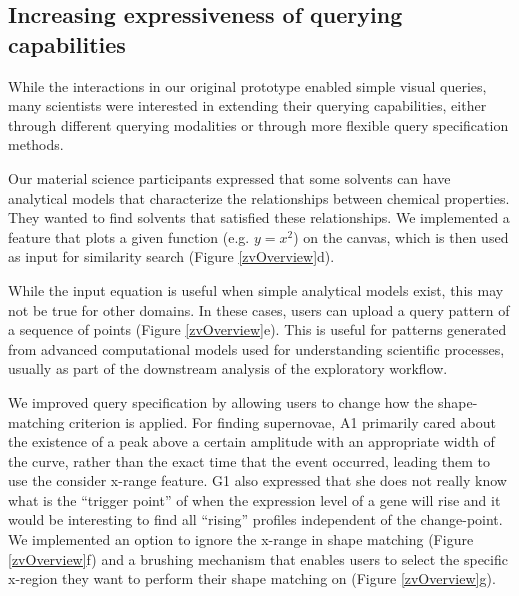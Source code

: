 \subsection{Increasing expressiveness of querying capabilities}
\par While the interactions in our original prototype enabled simple visual queries, many scientists were interested in extending their querying capabilities, either through different querying modalities or through more flexible query specification methods.

 Our material science participants expressed that some solvents can have analytical models that characterize the relationships between chemical properties. They wanted to find solvents that satisfied these relationships. We implemented a feature that plots a given function (e.g. $y=x^2$) on the canvas, which is then used as input for similarity search (Figure \ref{zvOverview}d).

 While the input equation is useful when simple analytical models exist, this may not be true for other domains. In these cases, users can upload a query pattern of a sequence of points (Figure \ref{zvOverview}e). This is useful for patterns generated from advanced computational models used for understanding scientific processes, usually as part of the downstream analysis of the exploratory workflow. %

 We improved query specification by allowing users to change how the shape-matching criterion is applied. For finding supernovae, A1 primarily cared about the existence of a peak above a certain amplitude with an appropriate width of the curve, rather than the exact time that the event occurred, leading them to use the consider x-range feature. G1 also expressed that she does not really know what is the ``trigger point'' of when the expression level of a gene will rise and it would be interesting to find all ``rising'' profiles independent of the change-point.  We implemented an option to ignore the x-range in shape matching (Figure \ref{zvOverview}f) and a brushing mechanism that enables users to select the specific x-region they want to perform their shape matching on (Figure \ref{zvOverview}g).
